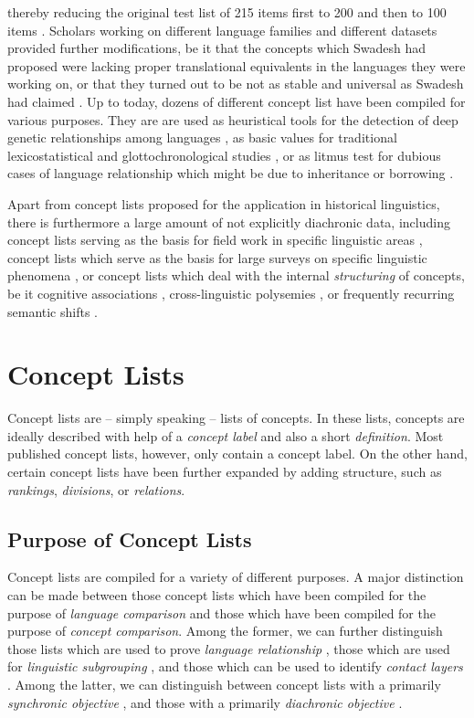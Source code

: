 \documentclass[10pt, a4paper]{article}
\begin{document}
thereby reducing the original test list of 215 items first to 200 \cite{Swadesh1952} and then to 100
items \cite{Swadesh1955}. Scholars working on different language families and different datasets
provided further modifications, be it that the concepts which Swadesh had proposed were lacking
proper translational equivalents in the languages they were working on, or that they
turned out to be not as stable and universal as Swadesh had claimed \cite{Matisoff1978,Alpher1999}. 
Up to today, dozens of different concept list have been compiled for various purposes.
They are are used as heuristical tools for the detection of deep genetic
relationships among languages \cite{Dolgopolsky1964}, 
as basic values for traditional
lexicostatistical and glottochronological studies \cite{Dyen1992,Starostin1991}, 
or as litmus test
for dubious cases of language relationship which might be due to inheritance or borrowing 
\cite{McMahon2005b,Chen1996,Wang2006}. 
 
Apart from concept lists proposed for the application in historical linguistics, there is
furthermore a large amount of not explicitly diachronic data, including concept lists serving as the
basis for field work in specific linguistic areas \cite{Kraft1981}, concept lists which serve as the
basis for large surveys on specific linguistic phenomena \cite{Wold2009}, or concept lists which deal with
the internal \emph{structuring} of concepts, be it cognitive associations \cite{Nelson2004},
cross-linguistic polysemies \cite{List2014f}, or frequently recurring semantic shifts
\cite{Bulakh2013}. 
\section{Concept Lists}
Concept lists are -- simply speaking -- lists of concepts. In these lists, concepts are ideally
described with help of a \emph{concept label} and also a short \emph{definition}. Most published
concept lists, however, only contain a concept label. On the other hand, certain concept lists have
been further expanded by
adding structure, such as \emph{rankings}, \emph{divisions}, or \emph{relations}.

\subsection{Purpose of Concept Lists}
Concept lists are compiled for a variety of different
purposes. A major distinction can be made between those concept lists which have been compiled for
the
purpose of \emph{language comparison} and those which have been compiled for the purpose of \emph{concept
comparison}. 
Among the former, we can further distinguish those lists which are used to prove \emph{language
relationship} \cite{Dolgopolsky1964}, those which are used for \emph{linguistic subgrouping}
\cite{Norman2003,Starostin1991,Swadesh1955}, and those which can be used to identify \emph{contact
layers} \cite{Chen1996}. Among the latter, we can distinguish between concept lists with a primarily
\emph{synchronic objective} \cite{Hill2014}, and those with a primarily \emph{diachronic objective}
\cite{Wold2009,Bulakh2013}.
\end{document}
